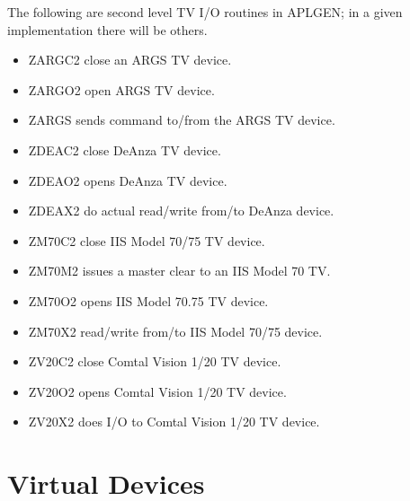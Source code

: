 The following are second level TV I/O routines in APLGEN; in a given
implementation there will be others.
\begin{itemize} %
\item ZARGC2  close an ARGS TV device.
\item ZARGO2  open ARGS TV device.
\item ZARGS   sends command to/from the ARGS TV device.
\item ZDEAC2  close DeAnza TV device.
\item ZDEAO2  opens DeAnza TV device.
\item ZDEAX2  do actual read/write from/to DeAnza
device.
\item ZM70C2  close IIS Model 70/75 TV device.
\item ZM70M2  issues a master clear to an IIS Model 70
TV.
\item ZM70O2  opens IIS Model 70.75 TV device.
\item ZM70X2  read/write from/to IIS Model 70/75 device.
\item ZV20C2  close Comtal Vision 1/20 TV device.
\item ZV20O2  opens Comtal Vision 1/20 TV device.
\item ZV20X2  does I/O to Comtal Vision 1/20 TV device.
\end{itemize} %

\section{Virtual Devices}

